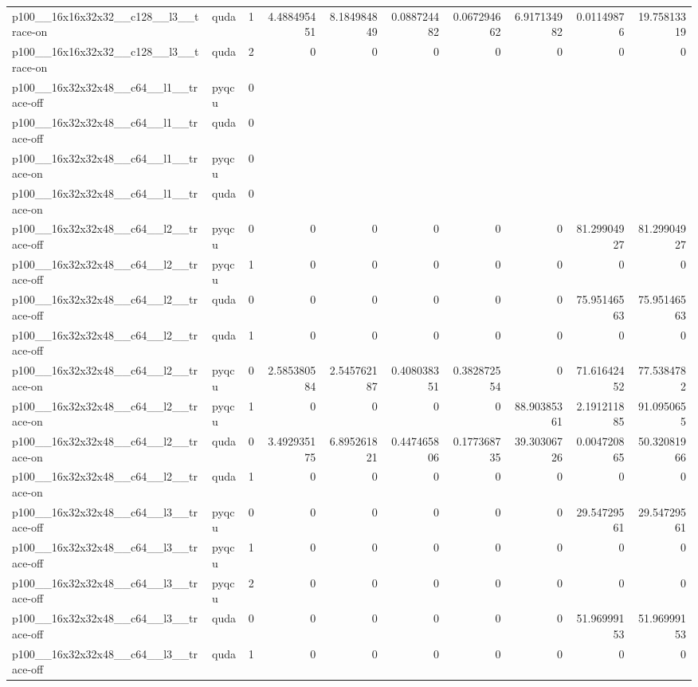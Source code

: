 \begin{table}[htbp]
\begin{tabular}{@{}llrrrrrrrr@{}}
p100\_\_16x16x32x32\_\_c128\_\_l3\_\_trace-on & quda & 1 & 4.488495451 & 8.184984849 & 0.088724482 & 0.067294662 & 6.917134982 & 0.01149876 & 19.75813319 \\
p100\_\_16x16x32x32\_\_c128\_\_l3\_\_trace-on & quda & 2 & 0 & 0 & 0 & 0 & 0 & 0 & 0 \\
p100\_\_16x32x32x48\_\_c64\_\_l1\_\_trace-off & pyqcu & 0 &  &  &  &  &  &  &  \\
p100\_\_16x32x32x48\_\_c64\_\_l1\_\_trace-off & quda & 0 &  &  &  &  &  &  &  \\
p100\_\_16x32x32x48\_\_c64\_\_l1\_\_trace-on & pyqcu & 0 &  &  &  &  &  &  &  \\
p100\_\_16x32x32x48\_\_c64\_\_l1\_\_trace-on & quda & 0 &  &  &  &  &  &  &  \\
p100\_\_16x32x32x48\_\_c64\_\_l2\_\_trace-off & pyqcu & 0 & 0 & 0 & 0 & 0 & 0 & 81.29904927 & 81.29904927 \\
p100\_\_16x32x32x48\_\_c64\_\_l2\_\_trace-off & pyqcu & 1 & 0 & 0 & 0 & 0 & 0 & 0 & 0 \\
p100\_\_16x32x32x48\_\_c64\_\_l2\_\_trace-off & quda & 0 & 0 & 0 & 0 & 0 & 0 & 75.95146563 & 75.95146563 \\
p100\_\_16x32x32x48\_\_c64\_\_l2\_\_trace-off & quda & 1 & 0 & 0 & 0 & 0 & 0 & 0 & 0 \\
p100\_\_16x32x32x48\_\_c64\_\_l2\_\_trace-on & pyqcu & 0 & 2.585380584 & 2.545762187 & 0.408038351 & 0.382872554 & 0 & 71.61642452 & 77.5384782 \\
p100\_\_16x32x32x48\_\_c64\_\_l2\_\_trace-on & pyqcu & 1 & 0 & 0 & 0 & 0 & 88.90385361 & 2.191211885 & 91.0950655 \\
p100\_\_16x32x32x48\_\_c64\_\_l2\_\_trace-on & quda & 0 & 3.492935175 & 6.895261821 & 0.447465806 & 0.177368735 & 39.30306726 & 0.004720865 & 50.32081966 \\
p100\_\_16x32x32x48\_\_c64\_\_l2\_\_trace-on & quda & 1 & 0 & 0 & 0 & 0 & 0 & 0 & 0 \\
p100\_\_16x32x32x48\_\_c64\_\_l3\_\_trace-off & pyqcu & 0 & 0 & 0 & 0 & 0 & 0 & 29.54729561 & 29.54729561 \\
p100\_\_16x32x32x48\_\_c64\_\_l3\_\_trace-off & pyqcu & 1 & 0 & 0 & 0 & 0 & 0 & 0 & 0 \\
p100\_\_16x32x32x48\_\_c64\_\_l3\_\_trace-off & pyqcu & 2 & 0 & 0 & 0 & 0 & 0 & 0 & 0 \\
p100\_\_16x32x32x48\_\_c64\_\_l3\_\_trace-off & quda & 0 & 0 & 0 & 0 & 0 & 0 & 51.96999153 & 51.96999153 \\
p100\_\_16x32x32x48\_\_c64\_\_l3\_\_trace-off & quda & 1 & 0 & 0 & 0 & 0 & 0 & 0 & 0 \\

\end{tabular}
\end{table}
